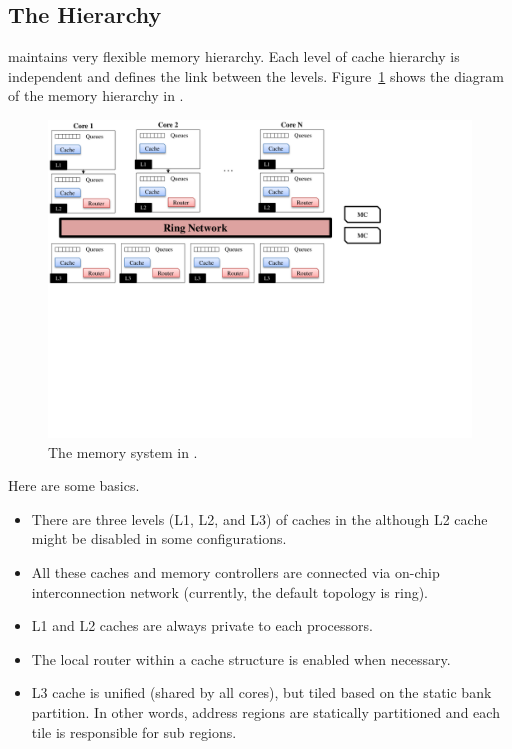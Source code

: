 \subsection{The Hierarchy}

\SIM maintains very flexible memory hierarchy. Each level of cache 
hierarchy is independent and \SIM defines the link between the
levels. Figure~\ref{fig:memory} shows the diagram of the memory
hierarchy in \SIM.

\begin{figure}[htb]
\centering
\includegraphics[width=6.5in]{figs/memory}
\caption{The memory system in \SIM.}
\label{fig:memory}
\end{figure}



Here are some basics.


\begin{itemize}
  \item There are three levels (L1, L2, and L3) of caches in the \SIM
  although L2 cache might be disabled in some configurations.

  \item All these caches and memory controllers are connected via
  on-chip interconnection network (currently, the default topology is
  ring).

  \item L1 and L2 caches are always private to each processors.

  \item The local router within a cache structure is enabled when
  necessary.

  \item L3 cache is unified (shared by all cores), but tiled based on
  the static bank partition. In other words, address regions are
  statically partitioned and each tile is responsible for sub regions.

\end{itemize}


